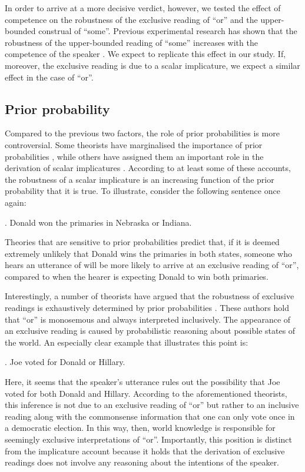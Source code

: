 \documentclass[12pt]{article}
\begin{document}
In order to arrive at a more decisive verdict, however, we tested the effect of competence on the robustness of the exclusive reading of ``or'' and the upper-bounded construal of ``some''. Previous experimental research has shown that the robustness of the upper-bounded reading of ``some'' increases with the competence of the speaker \citep{goodman2013}. We expect to replicate this effect in our study. If, moreover, the exclusive reading is due to a scalar implicature, we expect a similar effect in the case of ``or''.

\subsection*{Prior probability}

Compared to the previous two factors, the role of prior probabilities is more
controversial. Some theorists have marginalised the importance of prior probabilities
\citep{geurts2010}, while others have assigned them an important role in the derivation of
scalar implicatures \citep[e.g.,][]{frank2012,
  FrankeJager2015:Probabilistic-p,Russell2012:Probabilistic-R}. According to at least some of these accounts, the
robustness of a scalar implicature is an increasing function of the prior probability that it
is true. To illustrate, consider the following sentence once again:

\ex.	Donald won the primaries in Nebraska or Indiana.

Theories that are sensitive to prior probabilities predict that, if it is deemed extremely unlikely that Donald wins the primaries in both states, someone who hears an utterance of \Last will be more likely to arrive at an exclusive reading of ``or'', compared to when the hearer is expecting Donald to win both primaries.

Interestingly, a number of theorists have argued that the robustness of exclusive readings is exhaustively determined by prior probabilities \citep[e.g.,][]{barrett1971, rubin1989, yanal1988}. These authors hold that ``or'' is monosemous and always interpreted inclusively. The appearance of an exclusive reading is caused by probabilistic reasoning about possible states of the world. An especially clear example that illustrates this point is:

\ex.	Joe voted for Donald or Hillary.

Here, it seems that the speaker's utterance rules out the possibility that Joe voted for both Donald and Hillary. According to the aforementioned theorists, this inference is not due to an exclusive reading of ``or'' but rather to an inclusive reading along with the commonsense information that one can only vote once in a democratic election. In this way, then, world knowledge is responsible for seemingly exclusive interpretations of ``or''. Importantly, this position is distinct from the implicature account because it holds that the derivation of exclusive readings does not involve any reasoning about the intentions of the speaker.
\end{document}
